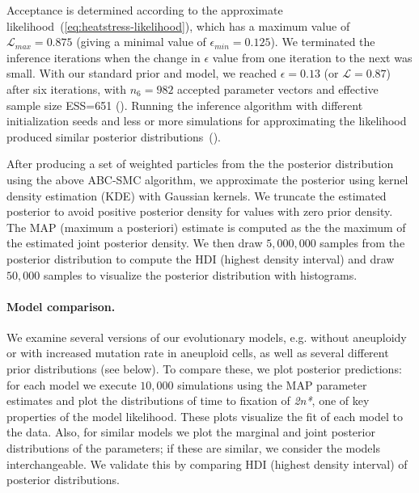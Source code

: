 \documentclass[12pt]{extarticle}
\newcommand{\likelihood}{\mathcal{L}}
\newcommand{\eumt}{\emph{2n*}}
\begin{document}
Acceptance is determined according to the approximate likelihood~(\cref{eq:heatstress-likelihood}), which has a maximum value of $\likelihood_{max}=0.875$ (giving a minimal value of $\epsilon_{min}=0.125$). We terminated the inference iterations when the change in $\epsilon$ value from one iteration to the next was small.
With our standard prior and model, we reached $\epsilon=0.13$ (or $\likelihood=0.87$) after six iterations, with $n_6=982$ accepted parameter vectors and effective sample size ESS=651 (). Running the inference algorithm with different initialization seeds and less or more simulations for approximating the likelihood produced similar posterior distributions~(). 

After producing a set of weighted particles from the the posterior distribution using the above ABC-SMC algorithm, we approximate the posterior using kernel density estimation (KDE) with Gaussian kernels. We truncate the estimated posterior to avoid positive posterior density for values with zero prior density. The MAP (maximum a posteriori) estimate is computed as the the maximum of the estimated joint posterior density. We then draw $5,000,000$ samples from the posterior distribution to compute the HDI (highest density interval) and draw $50,000$ samples to visualize the posterior distribution with histograms.

\paragraph{Model comparison.} 
We examine several versions of our evolutionary models, e.g. without aneuploidy or with increased mutation rate in aneuploid cells, as well as several different prior distributions (see below).
To compare these, we plot posterior predictions: for each model we execute $10,000$ simulations using the MAP parameter estimates and plot the distributions of time to fixation of \eumt, one of key properties of the model likelihood. These plots visualize the fit of each model to the data. 
Also, for similar models we plot the marginal and joint posterior distributions of the parameters; if these are similar, we consider the models interchangeable. We validate this by comparing HDI (highest density interval) of posterior distributions.
\end{document}
